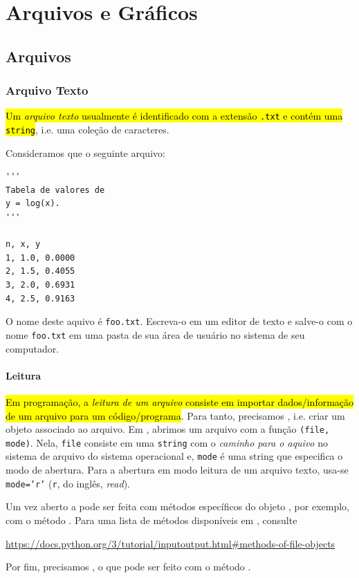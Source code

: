\chapter{Arquivos e Gráficos}\label{cap_ag}

\section{Arquivos}\label{cap_ag_sec_arq}

\subsection{Arquivo Texto}

\hl{Um \emph{arquivo texto} usualmente é identificado com a extensão \texttt{.txt} e contém uma \texttt{string}}, i.e. uma coleção de caracteres. 

Consideramos que o seguinte arquivo:

\begin{lstlisting}[caption = foo.txt, label=cap_ag_sec_arq:cod:foo.txt]
'''
Tabela de valores de
y = log(x).
'''

n, x, y
1, 1.0, 0.0000
2, 1.5, 0.4055
3, 2.0, 0.6931
4, 2.5, 0.9163
\end{lstlisting}

O nome deste aquivo é \texttt{foo.txt}. Escreva-o em um editor de texto e salve-o com o nome \texttt{foo.txt} em uma pasta de sua área de usuário no sistema de seu computador.

\subsubsection{Leitura}

\hl{Em programação, a \emph{leitura de um arquivo} consiste em importar dados/informação de um arquivo para um código/programa}. Para tanto, precisamos , i.e. criar um objeto {\PYTHONfile} associado ao arquivo. Em {\python}, abrimos um arquivo com a função {\PYTHONopen}\texttt{(file, mode)}. Nela, \texttt{file} consiste em uma \lstinline+string+ com o \emph{caminho para o aquivo} no sistema de arquivo do sistema operacional e, \texttt{mode} é uma string que especifica o modo de abertura. Para a abertura em modo leitura de um arquivo texto, usa-se \texttt{mode='r'} (\texttt{r}, do inglês, \textit{read}).

Um vez aberto a  pode ser feita com métodos específicos do objeto {\PYTHONfile}, por exemplo, com o método {\PYTHONfileDOTread}. Para uma lista de métodos disponíveis em {\python}, consulte
\begin{center}
  \url{https://docs.python.org/3/tutorial/inputoutput.html#methods-of-file-objects}
\end{center}
Por fim, precisamos , o que pode ser feito com o método {\PYTHONfileDOTclose}.

